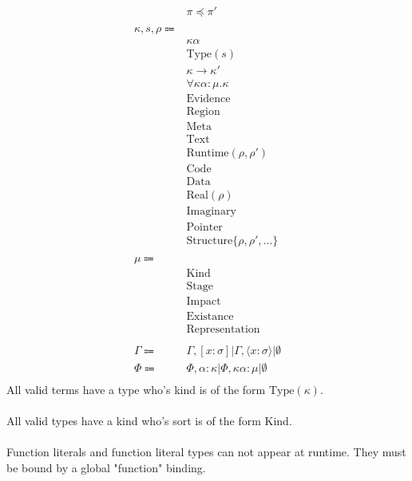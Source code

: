\documentclass {article}
\begin{document}
\begin{align*}
& \pi \preceq \pi' \tag*{[Region Scoping]} \\
\\
\kappa, s, \rho \Coloneqq & \\
& \kappa \alpha \tag*{[Kind Variable]} \\
& \text{Type} (s) \tag*{[Type]} \\
& \kappa \to \kappa' \tag*{[Higher Kinded]} \\
& \forall \kappa \alpha : \mu. \kappa \tag*{[Poly Kinded]}\\
& \text{Evidence} \tag*{[Evidence Stage]} \\
& \text{Region} \tag*{[Region]} \\
& \text{Meta} \tag*{[Meta Stage]}\\
& \text{Text} \tag*{[Symbol Stage]} \\
& \text{Runtime} (\rho, \rho') \tag*{[Runtime Stage]}\\
& \text{Code} \tag*{[Code Impact]}\\
& \text{Data} \tag*{[Data Impact]}\\
& \text{Real} (\rho) \tag*{[Real Existance]} \\
& \text{Imaginary} \tag*{[Imaginary Existance]} \\
& \text{Pointer} \tag*{[Pointer Representation]}\\
& \text{Structure} \{ \rho, \rho', \dots \} \tag*{[Structure Representation]} \\
\\
\mu \Coloneqq & \\
& \text{Kind} \\
& \text{Stage} \\
& \text{Impact} \\
& \text{Existance} \\
& \text{Representation} \\
\\
\Gamma \Coloneqq & \Gamma, [x : \sigma] | \Gamma, \langle x : \sigma \rangle | \emptyset \\
\Phi \Coloneqq & \Phi, \alpha : \kappa | \Phi, \kappa \alpha : \mu |  \emptyset \\
\end{align*}
All valid terms have a type who's kind is of the form $ \text{Type} (\kappa) $. \\
\\
All valid types have a kind who's sort is of the form $ \text{Kind} $.\\
\\
Function literals and function literal types can not appear at runtime. They must be bound by a global "function" binding.
\end{document}
